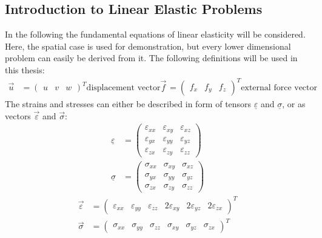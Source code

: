  \subsection{Introduction to Linear Elastic Problems}\label{sec:Shell-IntroLinEla}
 In the following the fundamental equations of linear elasticity will be considered. Here, the spatial case is used for demonstration, but every lower dimensional problem can easily be derived from it.
 The following definitions will be used in this thesis:
 \begin{align}
 \vec{u} &= \begin{pmatrix}
 u & v & w
 \end{pmatrix}^T \text{displacement\ vector}
 \vec{f} &= \begin{pmatrix}
 f_x & f_y & f_z
 \end{pmatrix}^T \text{external\ force\ vector}
 \end{align}
 The strains and stresses can either be described in form of tensors $\underline{\varepsilon}$ and $\underline{\sigma}$, or as vectors $\vec{\varepsilon}$ and $\vec{\sigma}$:
 \begin{align}
 \underline{\varepsilon} &= \begin{pmatrix}
 \varepsilon_{xx} & \varepsilon_{xy} & \varepsilon_{xz} \\
 \varepsilon_{yx} & \varepsilon_{yy} & \varepsilon_{yz} \\
 \varepsilon_{zx} & \varepsilon_{zy} & \varepsilon_{zz} \end{pmatrix}\\
 \underline{\sigma} &= \begin{pmatrix}
 \sigma_{xx} & \sigma_{xy} & \sigma_{xz} \\
 \sigma_{yx} & \sigma_{yy} & \sigma_{yz} \\
 \sigma_{zx} & \sigma_{zy} & \sigma_{zz} \end{pmatrix}
 \end{align}
 \begin{align}
 \vec{\varepsilon} &= \begin{pmatrix}
 \varepsilon_{xx} & \varepsilon_{yy} & \varepsilon_{zz} & 2\varepsilon_{xy} & 2\varepsilon_{yz} & 2\varepsilon_{zx} \end{pmatrix}^T\\
 \vec{\sigma} &= \begin{pmatrix}
 \sigma_{xx} & \sigma_{yy} & \sigma_{zz} & \sigma_{xy} & \sigma_{yz} & \sigma_{zx} \end{pmatrix}^T
 \end{align}
